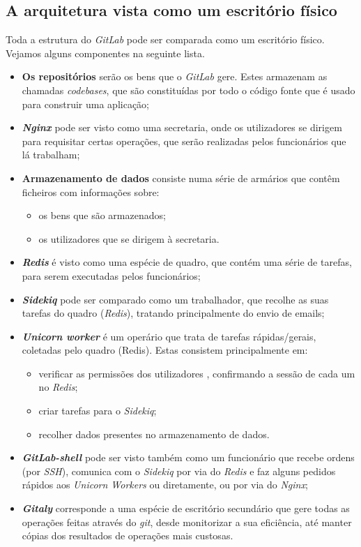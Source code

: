 \documentclass[12pt,a4paper]{article}
\begin{document}
\newpage
\subsection{A arquitetura vista como um escritório físico}

Toda a estrutura do \emph{GitLab} pode ser comparada como um escritório físico. Vejamos alguns componentes na seguinte lista.

\begin{itemize}
    \item \textbf{Os repositórios} serão os bens que o \emph{GitLab} gere. Estes armazenam as chamadas \textit{codebases}, que são constituídas por todo o código fonte que é usado para construir uma aplicação;
    \item \textbf{\emph{Nginx}} pode ser visto como uma secretaria, onde os utilizadores se dirigem para requisitar certas operações, que serão realizadas pelos funcionários que lá trabalham;
    \item \textbf{Armazenamento de dados} consiste numa série de armários que contêm ficheiros com informações sobre:
    \begin{itemize}
        \item os bens que são armazenados;
        \item os utilizadores que se dirigem à secretaria.
    \end{itemize}
    \item \textbf{\emph{Redis}} é visto como uma espécie de quadro, que contém uma série de tarefas, para serem executadas pelos funcionários;
    \item \textbf{\emph{Sidekiq}} pode ser comparado como um trabalhador, que recolhe as suas tarefas do quadro (\emph{Redis}), tratando principalmente do envio de emails;
    \item \textbf{\emph{Unicorn worker}} é um operário que trata de tarefas rápidas/gerais, coletadas pelo quadro (Redis). Estas consistem principalmente em:
    \begin{itemize}
        \item verificar as permissões dos utilizadores , confirmando a sessão de cada um no \emph{Redis};
        \item criar tarefas para o \emph{Sidekiq};
        \item recolher dados presentes no armazenamento de dados.
    \end{itemize}
    \item \textbf{\emph{GitLab-shell}} pode ser visto também como um funcionário que recebe ordens (por \emph{SSH}), comunica com o \emph{Sidekiq} por via do \emph{Redis} e faz alguns pedidos rápidos aos \emph{Unicorn Workers} ou diretamente, ou por via do \emph{Nginx};
    \item \textbf{\emph{Gitaly}} corresponde a uma espécie de escritório secundário que gere todas as operações feitas através do \emph{git}, desde monitorizar a sua eficiência, até manter cópias dos resultados de operações mais custosas.
\end{itemize}
\end{document}
